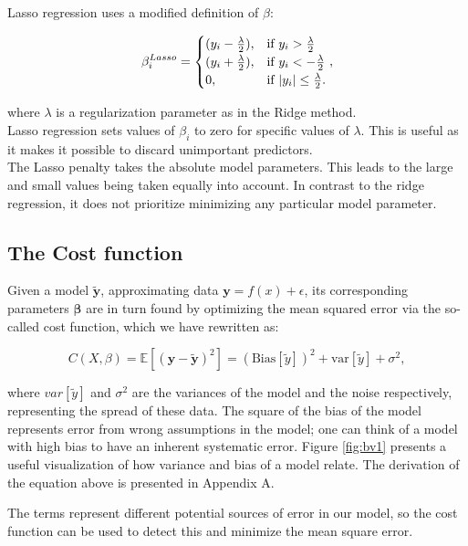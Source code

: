 \documentclass[reprint,english,notitlepage]{revtex4-1}  %
\begin{document}
Lasso regression uses a modified definition of $\beta$:

$$\beta^{Lasso}_i = \begin{cases}
    (y_i - \frac{\lambda}{2}), & \text{if  } y_i > \frac{\lambda}{2}\\
    (y_i + \frac{\lambda}{2}), & \text{if  } y_i < -\frac{\lambda}{2}\\ 
    0, & \text{if  } \abs{y_i} \leq \frac{\lambda}{2}.
\end{cases},$$

where $\lambda$ is a regularization parameter as in the Ridge method. \\


Lasso regression sets values of $\beta_i$ to zero for specific values of $\lambda$. This is useful as it makes it possible to discard unimportant predictors. \\




The Lasso penalty takes the absolute model parameters. This leads to the large and small values being taken equally into account. In contrast to the ridge regression, it does not prioritize minimizing any particular model parameter. 

\subsection{The Cost function}


Given a model $\tilde{\bm{y}}$, approximating data $\bm{y} = f(x) + \epsilon$, its corresponding parameters $\bm{\beta}$ are in turn found by optimizing the mean squared error via the so-called cost function, which we have rewritten as:

\[
C(X,\beta) = \mathbb{E}\left[(\bm{y}-\bm{\tilde{y}})^2\right]=(\mathrm{Bias}[\tilde{y}])^2+\mathrm{var}[\tilde{y}]+\sigma^2, 
\]

where $var[\tilde{y}]$ and $\sigma^2$ are the variances of the model and the noise respectively, representing the spread of these data. The square of the bias of the model represents error from wrong assumptions in the model; one can think of a model with high bias to have an inherent systematic error. Figure \ref{fig:bv1} presents a useful visualization of how variance and bias of a model relate. The derivation of the equation above is presented in Appendix A.

The terms represent different potential sources of error in our model, so the cost function can be used to detect this and minimize the mean square error.
\end{document}
